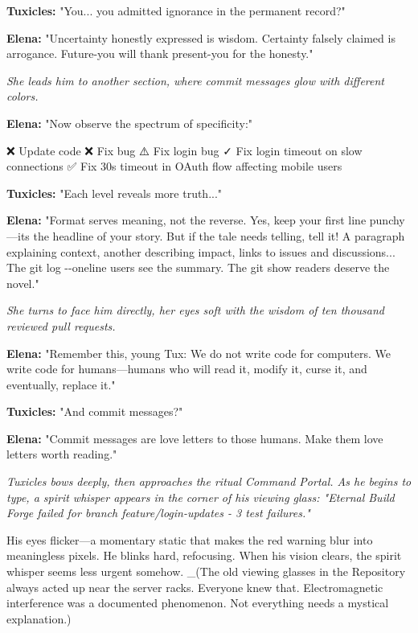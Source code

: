 \textbf{Tuxicles:} "You... you admitted ignorance in the permanent record?"

\textbf{Elena:} "Uncertainty honestly expressed is wisdom. Certainty falsely claimed is arrogance. Future-you will thank present-you for the honesty."

\emph{She leads him to another section, where commit messages glow with different colors.}

\textbf{Elena:} "Now observe the spectrum of specificity:"

\begin{codeblock}
❌ Update code
❌ Fix bug
⚠️  Fix login bug
✓  Fix login timeout on slow connections
✅ Fix 30s timeout in OAuth flow affecting mobile users
\end{codeblock}

\textbf{Tuxicles:} "Each level reveals more truth..."

\textbf{Elena:} "Format serves meaning, not the reverse. Yes, keep your first line punchy---it\textquotesingle s the headline of your story. But if the tale needs telling, tell it! A paragraph explaining context, another describing impact, links to issues and discussions... The git log -\/-oneline users see the summary. The git show readers deserve the novel."

\emph{She turns to face him directly, her eyes soft with the wisdom of ten thousand reviewed pull requests.}

\textbf{Elena:} "Remember this, young Tux: We do not write code for computers. We write code for humans---humans who will read it, modify it, curse it, and eventually, replace it."

\textbf{Tuxicles:} "And commit messages?"

\textbf{Elena:} "Commit messages are love letters to those humans. Make them love letters worth reading."

\emph{Tuxicles bows deeply, then approaches the ritual Command Portal. As he begins to type, a spirit whisper appears in the corner of his viewing glass: "Eternal Build Forge failed for branch \textquotesingle feature/login-updates\textquotesingle{} - 3 test failures."}

His eyes flicker---a momentary static that makes the red warning blur into meaningless pixels. He blinks hard, refocusing. When his vision clears, the spirit whisper seems less urgent somehow. \_(The old viewing glasses in the Repository always acted up near the server racks. Everyone knew that. Electromagnetic interference was a documented phenomenon. Not everything needs a mystical explanation.)

